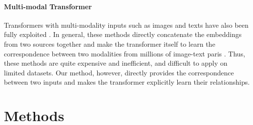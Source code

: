 \documentclass{bmvc2k}
\begin{document}
\vspace{-1.0em}
\paragraph{Multi-modal Transformer}
Transformers with multi-modality inputs such as images and texts have also been fully exploited \cite{kim2021vilt, tan2019lxmert, su2019vl, li2020unicoder, zhuge2021kaleido, you2021mrd, you2021self}. In general, these methods directly concatenate the embeddings from two sources together \cite{kim2021vilt} and make the transformer itself to learn the correspondence between two modalities from  millions of image-text paris \cite{sharma2018conceptual}. 
Thus, these methods are quite expensive and inefficient, and difficult to apply on limited datasets. Our method, however, directly provides the correspondence between two inputs and makes the transformer explicitly learn their relationships. 



\vspace{-1.0 em}
\section{Methods}
\vspace{-0.8 em}
\end{document}
